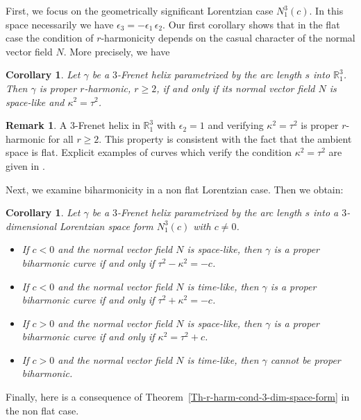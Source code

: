 \documentclass[11pt]{amsart}
\theoremstyle{plain}
\newtheorem{corollary}    [theorem]  {Corollary}
\theoremstyle{definition}
\newtheorem{remark}       [theorem]  {Remark}
\numberwithin{equation}{section}
\def \R{{\mathbb R}}
\begin{document}
First, we focus on the geometrically significant Lorentzian case $N^3_1(c)$. 
In this space necessarily we have $\epsilon_3 = -\epsilon_1 \, \epsilon_2$. Our first corollary shows that in the flat case the condition of $r$-harmonicity depends on the casual character of the normal vector field $N$. More precisely, we have
\begin{corollary}\label{Cor-facile}
Let $\gamma$ be a $3$-Frenet helix parametrized by the arc length $s$ into $\R^3_1$. 
Then $\gamma$ is proper $r$-harmonic, $r \geq 2$, if and only if its normal vector field $N$ is space-like and $\kappa^2 = \tau^2$.
\end{corollary}
\begin{remark}
A $3$-Frenet helix in $\R^3_1$ with $\epsilon_2=1$ and verifying $\kappa^2 = \tau^2$ is proper $r$-harmonic for all $r\geq 2$. This property is consistent with the fact that the ambient space is flat. Explicit examples of curves which verify the condition $\kappa^2 = \tau^2$ are given in \cite[Proposition~3.4]{Sasahara}.
\end{remark}
Next, we examine biharmonicity in a non flat Lorentzian case. Then we obtain:
\begin{corollary}
Let $\gamma$ be a $3$-Frenet helix parametrized by the arc length $s$ into a $3$-dimensional Lorentzian space form $N^3_1(c)$ with $c \neq 0$.
\begin{itemize}
\item[{\rm (i)}] If $c<0$ and the normal vector field $N$ is space-like, then $\gamma$ is a proper biharmonic curve if and only if $\tau^2 -\kappa^2 =-c$.
\item[{\rm (ii)}]  If $c<0$ and the normal vector field $N$ is time-like, then $\gamma$ is a proper biharmonic curve if and only if $\tau^2 +\kappa^2 =-c$. 
\item[{\rm (iii)}] If $c>0$ and the normal vector field $N$ is space-like, then $\gamma$ is a proper biharmonic curve if and only if $\kappa^2 =\tau^2 +c$.
\item [{\rm (iv)}] If $c>0$ and the normal vector field $N$ is time-like, then $\gamma$ cannot be proper biharmonic.
\end{itemize}
\end{corollary}
Finally, here is a consequence of Theorem~\ref{Th-r-harm-cond-3-dim-space-form} in the non flat case. 
\end{document}
